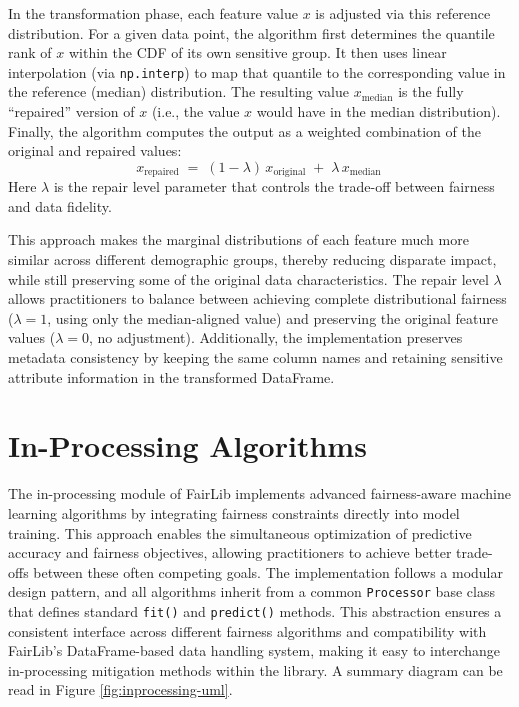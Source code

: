 \documentclass[12pt,a4paper,openright,twoside]{book}
\begin{document}
In the transformation phase, each feature value $x$ is adjusted via this reference distribution. For a given data point, the algorithm first determines the quantile rank of $x$ within the CDF of its own sensitive group. It then uses linear interpolation (via \texttt{np.interp}) to map that quantile to the corresponding value in the reference (median) distribution. The resulting value $x_{\text{median}}$ is the fully “repaired” version of $x$ (i.e., the value $x$ would have in the median distribution). Finally, the algorithm computes the output as a weighted combination of the original and repaired values: 
\[ 
x_{\text{repaired}} \;=\; (1 - \lambda)\,x_{\text{original}} \;+\; \lambda\,x_{\text{median}}\,
\] 
Here $\lambda$ is the repair level parameter that controls the trade-off between fairness and data fidelity.

This approach makes the marginal distributions of each feature much more similar across different demographic groups, thereby reducing disparate impact, while still preserving some of the original data characteristics. The repair level $\lambda$ allows practitioners to balance between achieving complete distributional fairness ($\lambda = 1$, using only the median-aligned value) and preserving the original feature values ($\lambda = 0$, no adjustment). Additionally, the implementation preserves metadata consistency by keeping the same column names and retaining sensitive attribute information in the transformed DataFrame.

\section{In-Processing Algorithms}
The in-processing module of FairLib implements advanced fairness-aware machine learning algorithms by integrating fairness constraints directly into model training. This approach enables the simultaneous optimization of predictive accuracy and fairness objectives, allowing practitioners to achieve better trade-offs between these often competing goals. The implementation follows a modular design pattern, and all algorithms inherit from a common \texttt{Processor} base class that defines standard \texttt{fit()} and \texttt{predict()} methods. This abstraction ensures a consistent interface across different fairness algorithms and compatibility with FairLib’s DataFrame-based data handling system, making it easy to interchange in-processing mitigation methods within the library. A summary diagram can be read in Figure \ref{fig:inprocessing-uml}.
\end{document}
